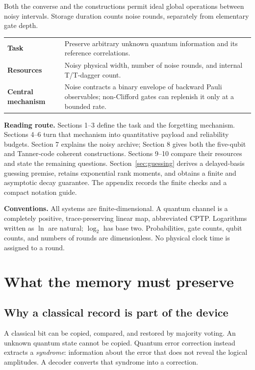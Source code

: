\documentclass[11pt,a4paper]{article}
\numberwithin{equation}{section}
\theoremstyle{remark}\newtheorem*{remark}{Interpretation}
\begin{document}
Both the converse and the constructions permit ideal global operations between noisy intervals. Storage duration counts noise rounds, separately from elementary gate depth.
\vfill
\begin{tabularx}{\linewidth}{@{}>{\raggedright\arraybackslash\bfseries}p{32mm}X@{}}
Task & Preserve arbitrary unknown quantum information and its reference correlations.\\[3pt]
Resources & Noisy physical width, number of noise rounds, and internal T/T-dagger count.\\[3pt]
Central mechanism & Noise contracts a binary envelope of backward Pauli observables; non-Clifford gates can replenish it only at a bounded rate.\\
\end{tabularx}
\newpage
\tableofcontents
\vspace{4mm}
\textbf{Reading route.} Sections 1--3 define the task and the forgetting mechanism. Sections 4--6 turn that mechanism into quantitative payload and reliability budgets. Section 7 explains the noisy archive; Section 8 gives both the five-qubit and Tanner-code coherent constructions. Sections 9--10 compare their resources and state the remaining questions. Section~\ref{sec:guessing} derives a delayed-basis guessing premise, retains exponential rank moments, and obtains a finite and asymptotic decay guarantee. The appendix records the finite checks and a compact notation guide.

\textbf{Conventions.} All systems are finite-dimensional. A quantum channel is a completely positive, trace-preserving linear map, abbreviated CPTP. Logarithms written as $\ln$ are natural; $\log_2$ has base two. Probabilities, gate counts, qubit counts, and numbers of rounds are dimensionless. No physical clock time is assigned to a round.

\section{What the memory must preserve}
\subsection{Why a classical record is part of the device}
A classical bit can be copied, compared, and restored by majority voting. An unknown quantum state cannot be copied. Quantum error correction instead extracts a \emph{syndrome}: information about the error that does not reveal the logical amplitudes. A decoder converts that syndrome into a correction.
\end{document}
